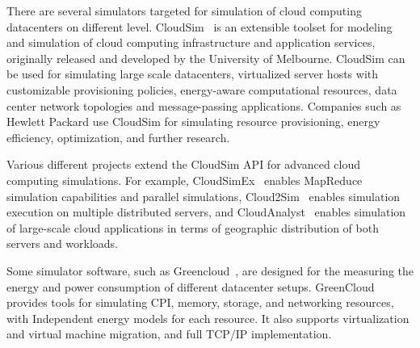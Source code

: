 There are several simulators targeted for simulation of cloud computing datacenters on different level. CloudSim~\cite{Calheiros:2011:Cloudsim} is an extensible toolset for modeling and simulation of cloud computing infrastructure and application services, originally released and developed by the University of Melbourne. CloudSim can be used for simulating large scale datacenters, virtualized server hosts with customizable provisioning policies, energy-aware computational resources, data center network topologies and message-passing applications. Companies such as Hewlett Packard use CloudSim for simulating resource provisioning, energy efficiency, optimization, and further research.

Various different projects extend the CloudSim API for advanced cloud computing simulations. For example, CloudSimEx~\cite{CloudSimEx} enables MapReduce simulation capabilities and parallel simulations, Cloud2Sim~\cite{Kathiravelu:2014:Concurrent} enables simulation execution on multiple distributed servers, and CloudAnalyst~\cite{Wickremasinghe:2010:CloudAnalyst} enables simulation of large-scale cloud applications in terms of geographic distribution of both servers and workloads.

Some simulator software, such as Greencloud~\cite{Kliazovich:2010:GreenCloud}, are designed for the measuring the energy and power consumption of different datacenter setups. GreenCloud provides tools for simulating CPI, memory, storage, and networking resources, with Independent energy models for each resource. It also supports virtualization and virtual machine migration, and full TCP/IP implementation.






